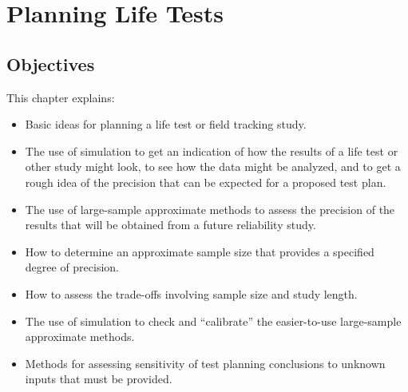 

\setcounter{chapter}{9}

\chapter{Planning Life Tests}
\label{chapter:test-planning}




\section*{Objectives}
This chapter explains:
\begin{itemize} 
\item 
Basic ideas for planning a life test or field tracking study.
\item 
The use of simulation to get an indication of how the results of
a life test or other
study might look, to see how the data might be analyzed, and to get
a rough idea of the precision that can be expected for a proposed test
plan.
\item 
The use of large-sample approximate methods 
to assess the precision of the results that will
be obtained from a future reliability study.
\item 
How to determine an approximate sample size that provides
a specified degree of precision.
\item 
How to assess the trade-offs involving sample size and study length.
\item 
The use of simulation to check and
``calibrate'' the easier-to-use large-sample approximate methods.
\item 
Methods for assessing sensitivity of test planning
conclusions to unknown inputs that must be provided.
\end{itemize}

